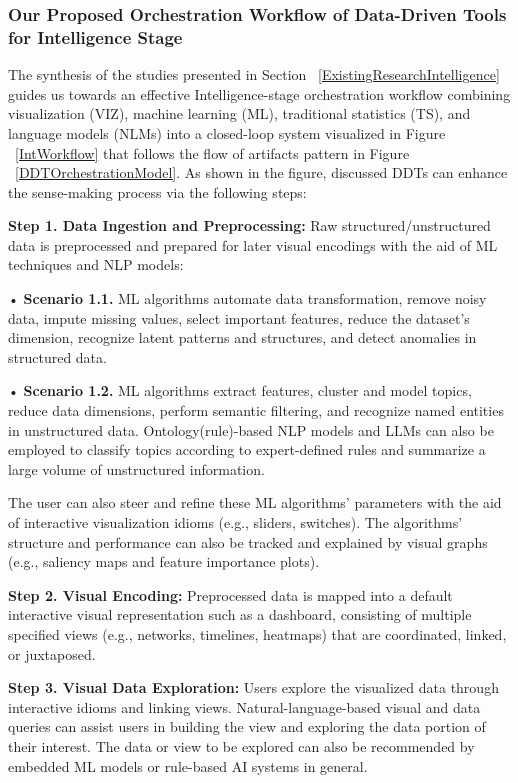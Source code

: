\documentclass{sfuthesis}
\begin{document}
\subsubsection{Our Proposed Orchestration Workflow of Data-Driven Tools for Intelligence Stage}
The synthesis of the studies presented in Section ~\ref{ExistingResearchIntelligence} guides us towards an effective Intelligence-stage orchestration workflow combining visualization (VIZ), machine learning (ML), traditional statistics (TS), and language models (NLMs) into a closed-loop system visualized in Figure ~\ref{IntWorkflow} that follows the flow of artifacts pattern in Figure ~\ref{DDTOrchestrationModel}. As shown in the figure, discussed DDTs can enhance the sense-making process via the following steps:\par
\textbf{Step 1. Data Ingestion and Preprocessing:} Raw structured/unstructured data is preprocessed and prepared for later visual encodings with the aid of ML techniques and NLP models:\par
{
\setlength{\leftskip}{0.5cm}
\noindent•	\textbf{Scenario 1.1.} ML algorithms automate data transformation, remove noisy data, impute missing values, select important features, reduce the dataset’s dimension, recognize latent patterns and structures, and detect anomalies in structured data.\par
\noindent•	\textbf{Scenario 1.2.} ML algorithms extract features, cluster and model topics, reduce data dimensions, perform semantic filtering, and recognize named entities in unstructured data. Ontology(rule)-based NLP models and LLMs can also be employed to classify topics according to expert-defined rules and summarize a large volume of unstructured information.\par
}
The user can also steer and refine these ML algorithms’ parameters with the aid of interactive visualization idioms (e.g., sliders, switches). The algorithms’ structure and performance can also be tracked and explained by visual graphs (e.g., saliency maps and feature importance plots).\par
\textbf{Step 2. Visual Encoding:} Preprocessed data is mapped into a default interactive visual representation such as a dashboard, consisting of multiple specified views (e.g., networks, timelines, heatmaps) that are coordinated, linked, or juxtaposed.\par 
\textbf{Step 3. Visual Data Exploration:} Users explore the visualized data through interactive idioms and linking views. Natural-language-based visual and data queries can assist users in building the view and exploring the data portion of their interest. The data or view to be explored can also be recommended by embedded ML models or rule-based AI systems in general.\par   
\end{document}
